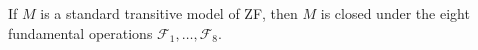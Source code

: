 If $M$ is a standard transitive model of ZF, then $M$ is closed under the eight fundamental operations $\mathcal{F}_1, \ldots, \mathcal{F}_8$.
